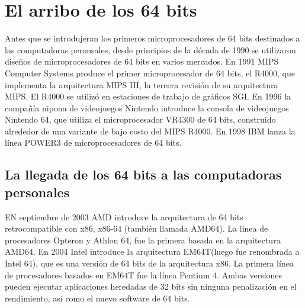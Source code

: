 \section{El arribo de los 64 bits}
Antes que se introdujeran los primeros microprocesadores de 64 bits destinados a las computadoras peronsales, desde principios de la década de 1990 se 
utilizaron diseños de microprocesadores de 64 bits en varios mercados. En 1991 MIPS Computer Systems produce el primer microprocesador de 64 bits, el R4000, 
que implementa la arquitectura MIPS III, la tercera revisión de su arquitectura MIPS. El R4000 se utilizó en estaciones de trabajo de gráficos SGI. En 1996
la compañía nipona de videojuegos Nintendo introduce la consola de videojuegos Nintendo 64, que utiliza el microprocesador VR4300 de 64 bits, construido alrededor 
de una variante de bajo costo del MIPS R4000. En 1998 IBM lanza la línea POWER3 de microprocesadores de 64 bits.
\subsection{La llegada de los 64 bits a las computadoras personales}
EN septiembre de 2003 AMD introduce  la arquitectura de 64 bits retrocompatible con x86, x86-64 (también llamada AMD64). La línea de procesadores Opteron 
y Athlon 64, fue la primera basada en la arquitectura AMD64. En 2004 Intel introduce la arquitectura EM64T(luego fue renombrada a Intel 64), que es una versión de 64 bits 
de la arquitectura x86. La primera línea de procesadores basados en EM64T fue la línea Pentium 4.  Ambas versiones pueden ejecutar aplicaciones heredadas de 32 bits sin 
ninguna penalización en el rendimiento, así como el nuevo software de 64 bits.

